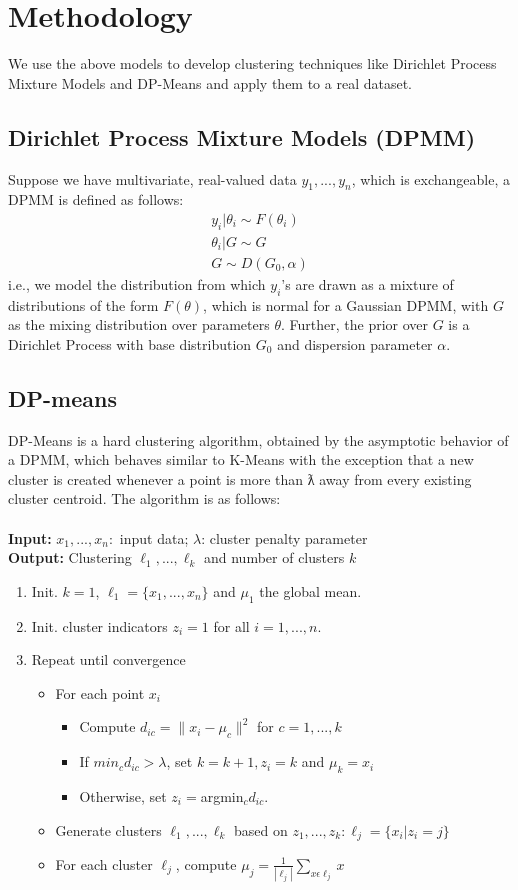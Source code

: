 \documentclass{article} %
\begin{document}
\section{Methodology}
We use the above models to develop clustering techniques like Dirichlet Process Mixture Models and DP-Means and apply them to a real dataset.
\subsection{Dirichlet Process Mixture Models (DPMM)}
Suppose we have multivariate, real-valued data $y_1,...,y_n$, which is exchangeable, a DPMM is defined as follows:
\begin{eqnarray*}
y_i|\theta_i \sim F(\theta_i)\\
\theta_i|G \sim G\\
G \sim D(G_0, \alpha)
\end{eqnarray*}
i.e., we model the distribution from which $y_i$'s are drawn as a mixture of distributions of the form $F(\theta)$, which is normal for a Gaussian DPMM, with $G$ as the mixing distribution over parameters $\theta$. Further, the prior over $G$ is a Dirichlet Process with base distribution $G_0$ and dispersion parameter $\alpha$.

\subsection{DP-means}
DP-Means is a hard clustering algorithm, obtained by the asymptotic behavior of a DPMM, which behaves similar to K-Means with the exception that a new cluster is created whenever a point is more than ƛ away from every existing cluster centroid. The algorithm is as follows:\\
\\
\textbf{Input:} $x_1,...,x_n:$ input data; $\lambda$: cluster penalty parameter\\
\textbf{Output:} Clustering $\ell_1,..., \ell_k$ and number of clusters $k$\\
\begin{enumerate}
\item Init. $k=1$, $\ell_1=\{x_1,...,x_n\}$ and $\mu_1$ the global mean.
\item Init. cluster indicators $z_i =1 $ for all $i=1,...,n.$
\item Repeat until convergence
\begin{itemize}
\item For each point $x_i$
\begin{itemize}
\item Compute $d_{ic}= \|x_i-\mu_c\|^2$ for $c = 1,...,k$
\item If $min_c d_{ic} >\lambda$, set $k = k+1, z_i =k$ and $\mu_k = x_i$
\item Otherwise, set $z_i=$argmin$_c d_{ic}$.
\end{itemize}
\item Generate clusters $\ell_1,..., \ell_k$ based on $z_1,...,z_k: \ell_j = \{x_i|z_i =j\}$
\item For each cluster $\ell_j$, compute $\mu_j = \frac{1}{|\ell_j|}\sum_{x\epsilon\ell_j}x$
\end{itemize}
\end{enumerate}
\end{document}
